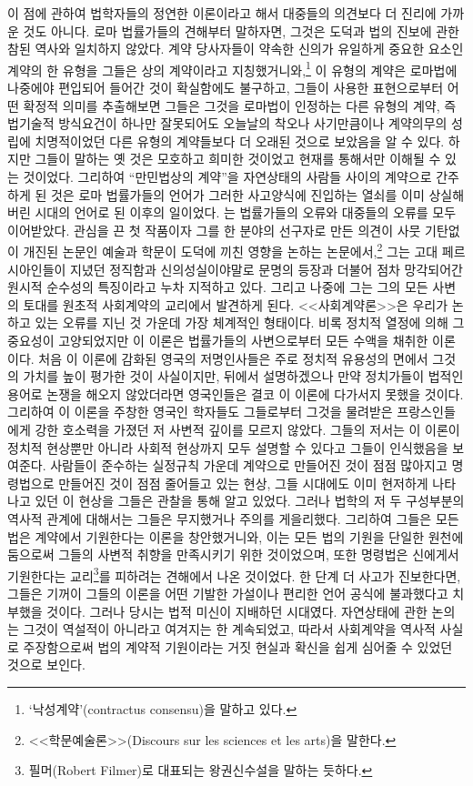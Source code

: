 이 점에 관하여 법학자들의 정연한 이론이라고 해서 대중들의 의견보다 더
진리에 가까운 것도 아니다.
로마 법률가들의 견해부터 말하자면,
그것은 도덕과 법의 진보에 관한 참된 역사와 일치하지 않았다.
계약 당사자들이 약속한 신의가 유일하게 중요한 요소인
계약의 한 유형을 그들은 상의 계약이라고
지칭했거니와,\footnote{%
  `낙성계약'(contractus consensu)을 말하고 있다.
  }
이 유형의 계약은 로마법에 나중에야 편입되어 들어간 것이 확실함에도
불구하고,
그들이 사용한 표현으로부터 어떤 확정적 의미를 추출해보면
그들은 그것을 로마법이 인정하는 다른 유형의 계약, 즉
법기술적 방식요건이 하나만 잘못되어도 오늘날의 착오나 사기만큼이나
계약의무의 성립에 치명적이었던 다른 유형의 계약들보다
더 오래된 것으로 보았음을 알 수 있다.
하지만 그들이 말하는 옛 것은 모호하고 희미한 것이었고
현재를 통해서만 이해될 수 있는 것이었다.
그리하여 ``만민법상의 계약''을
자연상태의 사람들 사이의 계약으로 간주하게 된 것은
로마 법률가들의 언어가
그러한 사고양식에 진입하는 열쇠를 이미 상실해버린 시대의 언어로 된
이후의 일이었다.
는 법률가들의 오류와 대중들의 오류를 모두 이어받았다.
관심을 끈 첫 작품이자
그를 한 분야의 선구자로 만든 의견이 사뭇 기탄없이 개진된 논문인
예술과 학문이 도덕에 끼친 영향을 논하는 논문에서,\footnote{%
  <<학문예술론>>(Discours sur les sciences et les arts)을 말한다. }
그는 고대 페르시아인들이 지녔던 정직함과 신의성실이야말로
문명의 등장과 더불어 점차 망각되어간 원시적 순수성의 특징이라고
누차 지적하고 있다.
그리고 나중에 그는
그의 모든 사변의 토대를
원초적 사회계약의 교리에서 발견하게 된다.
<<사회계약론>>은 우리가 논하고 있는 오류를 지닌 것 가운데 가장 체계적인 형태이다.
비록 정치적 열정에 의해 그 중요성이 고양되었지만
이 이론은 법률가들의 사변으로부터
모든 수액을 채취한 이론이다.
처음 이 이론에 감화된 영국의 저명인사들은
주로 정치적 유용성의 면에서 그것의 가치를 높이 평가한 것이 사실이지만,
뒤에서 설명하겠으나
만약 정치가들이 법적인 용어로 논쟁을 해오지 않았더라면
영국인들은 결코 이 이론에 다가서지 못했을 것이다.
그리하여 이 이론을 주창한 영국인 학자들도
그들로부터 그것을 물려받은 프랑스인들에게 강한 호소력을 가졌던
저 사변적 깊이를 모르지 않았다.
그들의 저서는 이 이론이 정치적 현상뿐만 아니라
사회적 현상까지 모두 설명할 수 있다고 그들이 인식했음을 보여준다.
사람들이 준수하는 실정규칙 가운데
계약으로 만들어진 것이 점점 많아지고
명령법으로 만들어진 것이 점점 줄어들고 있는 현상,
그들 시대에도 이미 현저하게 나타나고 있던 이 현상을
그들은 관찰을 통해 알고 있었다.
그러나 법학의 저 두 구성부분의 역사적 관계에 대해서는
그들은 무지했거나 주의를 게을리했다.
그리하여
그들은 모든 법은 계약에서 기원한다는 이론을 창안했거니와, 이는
모든 법의 기원을 단일한 원천에 둠으로써 그들의 사변적 취향을
만족시키기 위한 것이었으며,
또한
명령법은 신에게서 기원한다는 교리\footnote{%
  필머(Robert Filmer)로 대표되는 왕권신수설을 말하는 듯하다.
}를 피하려는 견해에서 나온 것이었다.
한 단계 더 사고가 진보한다면,
그들은 기꺼이
그들의 이론을
어떤 기발한 가설이나 편리한 언어 공식에 불과했다고
치부했을 것이다.
그러나 당시는 법적 미신이 지배하던 시대였다.
자연상태에 관한 논의는 그것이 역설적이 아니라고 여겨지는 한 계속되었고,
따라서
사회계약을 역사적 사실로 주장함으로써
법의 계약적 기원이라는 거짓 현실과 확신을
쉽게 심어줄 수 있었던 것으로 보인다.

